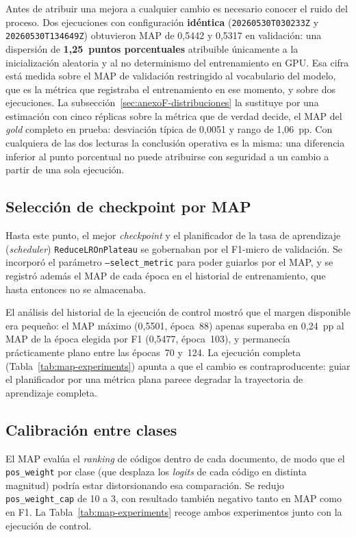 Antes de atribuir una mejora a cualquier cambio es necesario conocer el ruido del proceso. Dos ejecuciones con configuración \textbf{idéntica} (\texttt{20260530T030233Z} y \texttt{20260530T134649Z}) obtuvieron MAP de 0{,}5442 y 0{,}5317 en validación: una dispersión de \textbf{1{,}25~puntos porcentuales} atribuible únicamente a la inicialización aleatoria y al no determinismo del entrenamiento en GPU. Esa cifra está medida sobre el MAP de validación restringido al vocabulario del modelo, que es la métrica que registraba el entrenamiento en ese momento, y sobre dos ejecuciones. La subsección~\ref{sec:anexoF-distribuciones} la sustituye por una estimación con cinco réplicas sobre la métrica que de verdad decide, el MAP del \emph{gold} completo en prueba: desviación típica de 0{,}0051 y rango de 1{,}06~pp. Con cualquiera de las dos lecturas la conclusión operativa es la misma: una diferencia inferior al punto porcentual no puede atribuirse con seguridad a un cambio a partir de una sola ejecución.

\subsection{Selección de checkpoint por MAP}

Hasta este punto, el mejor \emph{checkpoint} y el planificador de la tasa de aprendizaje (\emph{scheduler}) \texttt{ReduceLROnPlateau} se gobernaban por el F1-micro de validación. Se incorporó el parámetro \texttt{--select\_metric} para poder guiarlos por el MAP, y se registró además el MAP de cada época en el historial de entrenamiento, que hasta entonces no se almacenaba.

El análisis del historial de la ejecución de control mostró que el margen disponible era pequeño: el MAP máximo (0{,}5501, época~88) apenas superaba en 0{,}24~pp al MAP de la época elegida por F1 (0{,}5477, época~103), y permanecía prácticamente plano entre las épocas~70 y~124. La ejecución completa (Tabla~\ref{tab:map-experiments}) apunta a que el cambio es contraproducente: guiar el planificador por una métrica plana parece degradar la trayectoria de aprendizaje completa.

\subsection{Calibración entre clases}

El MAP evalúa el \emph{ranking} de códigos dentro de cada documento, de modo que el \texttt{pos\_weight} por clase (que desplaza los \emph{logits} de cada código en distinta magnitud) podría estar distorsionando esa comparación. Se redujo \texttt{pos\_weight\_cap} de 10 a 3, con resultado también negativo tanto en MAP como en F1. La Tabla~\ref{tab:map-experiments} recoge ambos experimentos junto con la ejecución de control.

